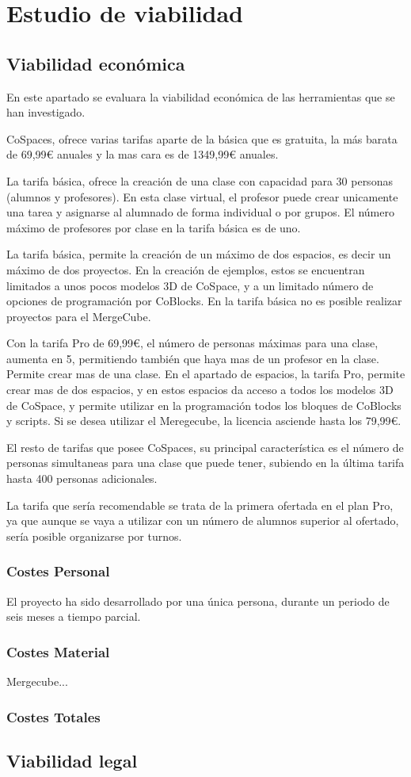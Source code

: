\section{Estudio de viabilidad}

\subsection{Viabilidad económica}

En este apartado se evaluara la viabilidad económica de las herramientas que se han investigado.


CoSpaces, ofrece varias tarifas aparte de la básica que es gratuita, la más barata de 69,99\euro{}  anuales y la mas cara es de 1349,99\euro{} anuales.

La tarifa básica, ofrece la creación de una clase con capacidad para 30 personas (alumnos y profesores). En esta clase virtual, el profesor puede crear unicamente una tarea y asignarse al alumnado de forma individual o por grupos. El número máximo de profesores por clase en la tarifa básica es de uno.

La tarifa básica, permite la creación de un máximo de dos espacios, es decir un máximo de dos proyectos. En la creación de ejemplos, estos se encuentran limitados a unos pocos modelos 3D de CoSpace, y a un limitado número de opciones de programación por CoBlocks. En la tarifa básica no es posible realizar proyectos para el MergeCube.

Con la tarifa Pro de 69,99\euro{}, el número de personas máximas para una clase, aumenta en 5, permitiendo también que haya mas de un profesor en la clase. Permite crear mas de una clase. En el apartado de espacios, la tarifa Pro, permite crear mas de dos espacios, y en estos espacios da acceso a todos los modelos 3D de CoSpace, y permite utilizar en la programación todos los bloques de CoBlocks y scripts.
Si se desea utilizar el Meregecube, la licencia asciende hasta los 79,99\euro{}. 

El resto de tarifas que posee CoSpaces, su principal característica es el número de personas simultaneas para una clase que puede tener, subiendo en la última tarifa hasta 400 personas adicionales.

La tarifa que sería recomendable se trata de la primera ofertada en el plan Pro, ya que aunque se vaya a utilizar con un número de alumnos superior al ofertado, sería posible organizarse por turnos.

\subsubsection{Costes Personal}
El proyecto ha sido desarrollado por una única persona, durante un periodo de seis meses a tiempo parcial.

\subsubsection{Costes Material}
Mergecube...
\subsubsection{Costes Totales}
\subsection{Viabilidad legal}


